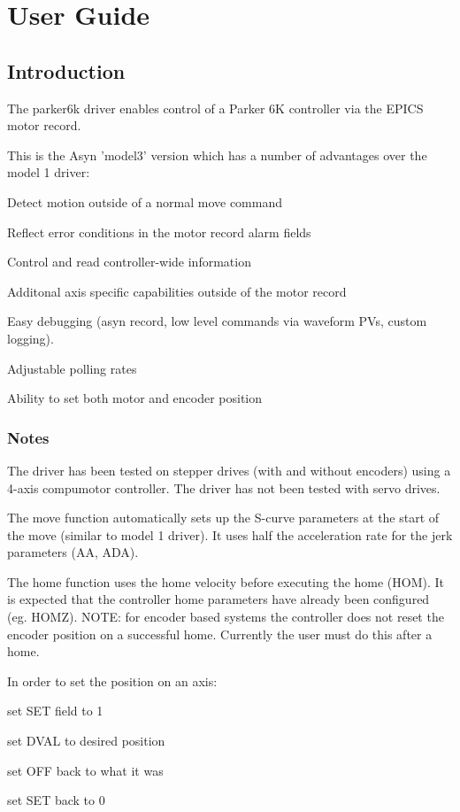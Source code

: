 \hypertarget{index_user}{}\section{User Guide}\label{index_user}
\hypertarget{index_intro}{}\subsection{Introduction}\label{index_intro}
The parker6k driver enables control of a Parker 6K controller via the EPICS motor record.

This is the Asyn 'model3' version which has a number of advantages over the model 1 driver:


\begin{DoxyItemize}
\item Detect motion outside of a normal move command 
\item Reflect error conditions in the motor record alarm fields 
\item Control and read controller-\/wide information 
\item Additonal axis specific capabilities outside of the motor record 
\item Easy debugging (asyn record, low level commands via waveform PVs, custom logging). 
\item Adjustable polling rates 
\item Ability to set both motor and encoder position 
\end{DoxyItemize}\hypertarget{index_notes}{}\subsubsection{Notes}\label{index_notes}
The driver has been tested on stepper drives (with and without encoders) using a 4-\/axis compumotor controller. The driver has not been tested with servo drives.

The move function automatically sets up the S-\/curve parameters at the start of the move (similar to model 1 driver). It uses half the acceleration rate for the jerk parameters (AA, ADA).

The home function uses the home velocity before executing the home (HOM). It is expected that the controller home parameters have already been configured (eg. HOMZ). NOTE: for encoder based systems the controller does not reset the encoder position on a successful home. Currently the user must do this after a home.

In order to set the position on an axis: 
\begin{DoxyEnumerate}
\item set SET field to 1 
\item set DVAL to desired position 
\item set OFF back to what it was 
\item set SET back to 0 
\end{DoxyEnumerate}

